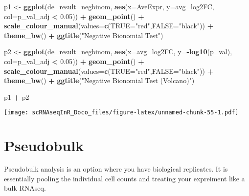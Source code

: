 \documentclass[
]{book}
\newenvironment{Shaded}{\begin{snugshade}}{\end{snugshade}}
\newcommand{\AttributeTok}[1]{\textcolor[rgb]{0.13,0.29,0.53}{#1}}
\newcommand{\FloatTok}[1]{\textcolor[rgb]{0.00,0.00,0.81}{#1}}
\newcommand{\FunctionTok}[1]{\textcolor[rgb]{0.13,0.29,0.53}{\textbf{#1}}}
\newcommand{\NormalTok}[1]{#1}
\newcommand{\OtherTok}[1]{\textcolor[rgb]{0.56,0.35,0.01}{#1}}
\newcommand{\SpecialCharTok}[1]{\textcolor[rgb]{0.81,0.36,0.00}{\textbf{#1}}}
\newcommand{\StringTok}[1]{\textcolor[rgb]{0.31,0.60,0.02}{#1}}
\begin{document}
\begin{Shaded}
\begin{Highlighting}[]
\NormalTok{p1 }\OtherTok{\textless{}{-}} \FunctionTok{ggplot}\NormalTok{(de\_result\_negbinom, }\FunctionTok{aes}\NormalTok{(}\AttributeTok{x=}\NormalTok{AveExpr, }\AttributeTok{y=}\NormalTok{avg\_log2FC, }\AttributeTok{col=}\NormalTok{p\_val\_adj }\SpecialCharTok{\textless{}} \FloatTok{0.05}\NormalTok{)) }\SpecialCharTok{+}
  \FunctionTok{geom\_point}\NormalTok{() }\SpecialCharTok{+}
  \FunctionTok{scale\_colour\_manual}\NormalTok{(}\AttributeTok{values=}\FunctionTok{c}\NormalTok{(}\StringTok{\textquotesingle{}TRUE\textquotesingle{}}\OtherTok{=}\StringTok{"red"}\NormalTok{,}\StringTok{\textquotesingle{}FALSE\textquotesingle{}}\OtherTok{=}\StringTok{"black"}\NormalTok{)) }\SpecialCharTok{+} 
  \FunctionTok{theme\_bw}\NormalTok{() }\SpecialCharTok{+}
  \FunctionTok{ggtitle}\NormalTok{(}\StringTok{"Negative Bionomial Test"}\NormalTok{)}


\NormalTok{p2 }\OtherTok{\textless{}{-}} \FunctionTok{ggplot}\NormalTok{(de\_result\_negbinom, }\FunctionTok{aes}\NormalTok{(}\AttributeTok{x=}\NormalTok{avg\_log2FC, }\AttributeTok{y=}\SpecialCharTok{{-}}\FunctionTok{log10}\NormalTok{(p\_val), }\AttributeTok{col=}\NormalTok{p\_val\_adj }\SpecialCharTok{\textless{}} \FloatTok{0.05}\NormalTok{)) }\SpecialCharTok{+}
  \FunctionTok{geom\_point}\NormalTok{() }\SpecialCharTok{+}
  \FunctionTok{scale\_colour\_manual}\NormalTok{(}\AttributeTok{values=}\FunctionTok{c}\NormalTok{(}\StringTok{\textquotesingle{}TRUE\textquotesingle{}}\OtherTok{=}\StringTok{"red"}\NormalTok{,}\StringTok{\textquotesingle{}FALSE\textquotesingle{}}\OtherTok{=}\StringTok{"black"}\NormalTok{)) }\SpecialCharTok{+} 
  \FunctionTok{theme\_bw}\NormalTok{() }\SpecialCharTok{+}
  \FunctionTok{ggtitle}\NormalTok{(}\StringTok{"Negative Bionomial Test (Volcano)"}\NormalTok{)}

\NormalTok{p1 }\SpecialCharTok{+}\NormalTok{ p2}
\end{Highlighting}
\end{Shaded}

\texttt{[image: scRNAseqInR\_Doco\_files/figure-latex/unnamed-chunk-55-1.pdf]}

\hypertarget{pseudobulk}{%
\section{Pseudobulk}\label{pseudobulk}}

Pseudobulk analysis is an option where you have biological replicates. It is essentially pooling the individual cell counts and treating your expreiment like a bulk RNAseq.
\end{document}
